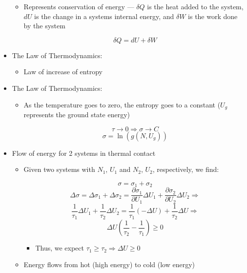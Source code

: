 \begin{itemize}
\begin{itemize}
      \item Represents conservation of energy — $\delta Q$ is the heat added to the system, $dU$ is the change in a systems internal energy, and $\delta W$ is the work done by the system

        $$\delta Q=dU+\delta W$$

    \end{itemize}

  \item The  Law of Thermodynamics:

    \begin{itemize}

      \item Law of increase of entropy

    \end{itemize}

  \item The  Law of Thermodynamics:

    \begin{itemize}

      \item As the temperature goes to zero, the entropy goes to a constant ($U_g$ represents the ground state energy)

        $$\tau\to0\Rightarrow\sigma\to C$$
        $$\sigma=\ln(g(N,U_g))$$

    \end{itemize}

  \item Flow of energy for 2 systems in thermal contact

    \begin{itemize}

      \item Given two systems with $N_1$, $U_1$ and $N_2$, $U_2$, respectively, we find:

        $$\sigma=\sigma_1+\sigma_2$$
        $$\Delta \sigma=\Delta\sigma_1+\Delta\sigma_2=\frac{\partial\sigma_1}{\partial U_1}\Delta U_1+\frac{\partial\sigma_2}{\partial U_2}\Delta U_2\Rightarrow$$
        $$\frac{1}{\tau_1}\Delta U_1+\frac{1}{\tau_2}\Delta U_2=\frac{1}{\tau_1}(-\Delta U)+\frac{1}{\tau_2}\Delta U\Rightarrow$$
        $$\Delta U\left( \frac{1}{\tau_2}-\frac{1}{\tau_1} \right)\geq 0$$

        \begin{itemize}

          \item Thus, we expect $\tau_1\geq\tau_2\Rightarrow\Delta U\geq0$

        \end{itemize}

      \item Energy flows from hot (high energy) to cold (low energy)

    \end{itemize}

\end{itemize}



